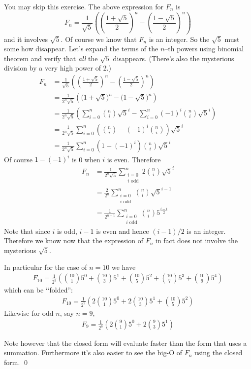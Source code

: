 \begin{ex} [REMOVE?]
You may skip this exercise.
The above expression for $F_n$ is
\[
F_n = 
\frac{1}{\sqrt{5}} 
\left( 
\left( \frac{1 + \sqrt{5}}{2} \right)^n
-
\left( \frac{1 - \sqrt{5}}{2} \right)^n
\right)
\]
and it involves $\sqrt{5}$. 
Of course we know that $F_n$ is an integer.
So the $\sqrt{5}$ must some how disappear.
Let's expand the terms of the $n$--th powers
using binomial theorem and
verify that \textit{all} the $\sqrt{5}$ disappears.
(There's also the mysterious division
by a very high power of 2.)
\begin{align*}
F_n 
&= 
\frac{1}{\sqrt{5}} 
\left( 
\left( \frac{1 + \sqrt{5}}{2} \right)^n
-
\left( \frac{1 - \sqrt{5}}{2} \right)^n
\right) \\
&=
\frac{1}{2^n\sqrt{5}} 
\left( 
\bigl(
1 + \sqrt{5}
\bigr)^n
-
\bigl(
1 - \sqrt{5}
\bigr)^n
\right) \\
&=
\frac{1}{2^n\sqrt{5}} 
\left(
\sum_{i=0}^n \binom{n}{i}\sqrt{5}^i
- 
\sum_{i=0}^n (-1)^i\binom{n}{i}\sqrt{5}^i
\right) \\
&=
\frac{1}{2^n\sqrt{5}} 
\sum_{i=0}^n 
\left(
\binom{n}{i}
- 
(-1)^i\binom{n}{i}
\right)
\sqrt{5}^i \\
&=
\frac{1}{2^n\sqrt{5}} 
\sum_{i=0}^n 
(1
- 
(-1)^i)
\binom{n}{i}
\sqrt{5}^i
\end{align*}
Of course $1 - (-1)^i$ is 0 when $i$ is even.
Therefore
\begin{align*}
F_n 
&=
\frac{1}{2^n\sqrt{5}} 
\sum_{\substack{i=0 \\ i \text{ odd}}}^n 
2
\binom{n}{i}
\sqrt{5}^i \\
&=
\frac{2}{2^n} 
\sum_{\substack{i=0 \\ i \text{ odd}}}^n 
\binom{n}{i}
\sqrt{5}^{i-1} \\
&=
\frac{1}{2^{n-1}} 
\sum_{\substack{i=0 \\ i \text{ odd}}}^n 
\binom{n}{i}
5^{\frac{i-1}{2}}
\end{align*}
Note that since $i$ is odd, $i-1$ is even and 
hence $(i-1)/2$ is an integer.
Therefore we know now
that the expression of $F_n$ in fact does not involve the
mysterious $\sqrt{5}$.

In particular for the case of $n = 10$ we have
\begin{align*}
F_{10}
= \frac{1}{2^{9}} 
\left(
\binom{10}{1} 5^{0} +
\binom{10}{3} 5^{1} +
\binom{10}{5} 5^{2} +
\binom{10}{7} 5^{3} +
\binom{10}{9} 5^{4}
\right)
\end{align*}
which can be \lq\lq folded'':
\begin{align*}
F_{10}
= \frac{1}{2^{9}} 
\left(
2\binom{10}{1} 5^{0} +
2\binom{10}{3} 5^{1} +
\binom{10}{5} 5^{2}
\right)
\end{align*}
Likewise for odd $n$, say $n = 9$, 
\begin{align*}
F_{9}
= \frac{1}{2^{8}} 
\left(
2\binom{9}{1} 5^{0} +
2\binom{9}{3} 5^{1}
\right)
\end{align*}

Note however that the closed form will evaluate faster
than the form that uses a summation.
Furthermore it's also easier to see the big-O of $F_n$
using the closed form.
\qed
\end{ex}



